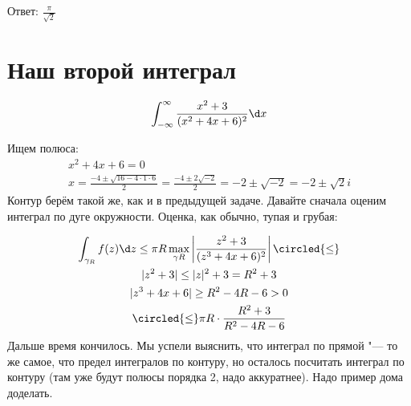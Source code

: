 	Ответ: $\frac{\pi}{\sqrt 2}$

\section{Наш второй интеграл}
	\[
		\int_{-\infty}^{\infty} \frac{x^2+3}{(x^2+4x+6)^2} \d x
	\]

	Ищем полюса:
	\begin{gather*}
		x^2+4x+6 = 0 \\
		x = \frac{-4\pm\sqrt{16-4\cdot1\cdot6}}{2} =
		\frac{-4\pm2\sqrt{-2}}{2} =
		-2\pm\sqrt{-2} =
		-2\pm\sqrt{2}i
	\end{gather*}
	Контур берём такой же, как и в предыдущей задаче.
	Давайте сначала оценим интеграл по дуге окружности.
	Оценка, как обычно, тупая и грубая:
	
	\begin{gather*}
		\int_{\gamma_R} f(z) \d z \le
		\pi R \max_{\gamma R} \left|\frac{z^2+3}{(z^3+4x+6)^2}\right| \circled{\le} \\
		|z^2+3| \le |z|^2+3 = R^2 + 3 \\
		|z^3+4x+6| \ge R^2-4R-6 > 0 \\
		\circled{\le} \pi R \cdot \frac{R^2+3}{R^2-4R-6}
	\end{gather*}
	Дальше время кончилось.
	Мы успели выяснить, что интеграл по прямой "--- то же самое, что предел интегралов по контуру,
	но осталось посчитать интеграл по контуру (там уже будут полюсы порядка 2, надо аккуратнее).
	Надо пример дома доделать.

